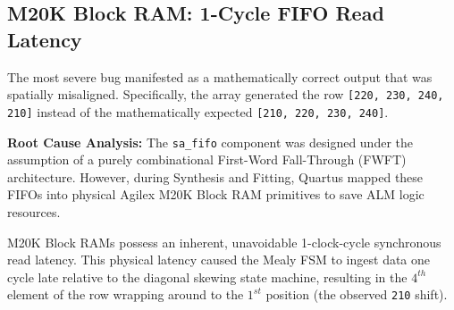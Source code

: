 \documentclass[12pt, letterpaper]{article}
\begin{document}
\subsection{M20K Block RAM: 1-Cycle FIFO Read Latency}
The most severe bug manifested as a mathematically correct output that was spatially misaligned. Specifically, the array generated the row \texttt{[220, 230, 240, 210]} instead of the mathematically expected \texttt{[210, 220, 230, 240]}.

\textbf{Root Cause Analysis:} The \texttt{sa\_fifo} component was designed under the assumption of a purely combinational First-Word Fall-Through (FWFT) architecture. However, during Synthesis and Fitting, Quartus mapped these FIFOs into physical Agilex M20K Block RAM primitives to save ALM logic resources. 

M20K Block RAMs possess an inherent, unavoidable 1-clock-cycle synchronous read latency. This physical latency caused the Mealy FSM to ingest data one cycle late relative to the diagonal skewing state machine, resulting in the $4^{th}$ element of the row wrapping around to the $1^{st}$ position (the observed \texttt{210} shift). 
\end{document}
